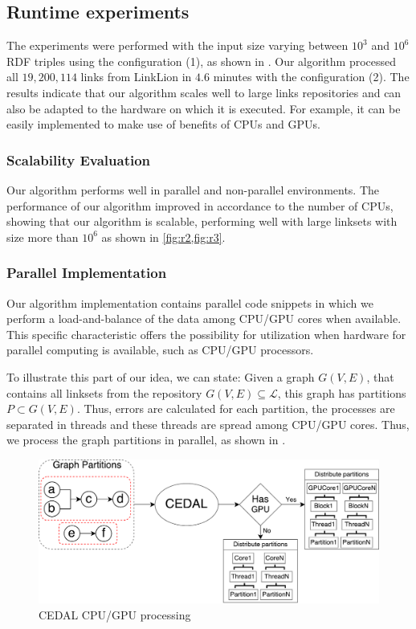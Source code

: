 \subsection{Runtime experiments}

The experiments were performed with the input size varying between $10^3$ and $10^6$ RDF triples using the configuration (1), as shown in . Our algorithm processed all $19,200,114$ links from LinkLion in $4.6$ minutes with the configuration (2). 
The results indicate that our algorithm scales well to large links repositories and can also be adapted to the hardware on which it is executed. For example, it can be easily implemented to make use of benefits of CPUs and GPUs.

\subsubsection{Scalability Evaluation}

Our algorithm performs well in parallel and non-parallel environments. The performance of our algorithm improved in accordance to the number of CPUs, showing that our algorithm is scalable, performing well with large linksets with size more than $10^6$ as shown in \cref{fig:r2,fig:r3}.

\subsubsection{Parallel Implementation}

Our algorithm implementation contains parallel code snippets in which we perform a load-and-balance of the data among CPU/GPU cores when available. This specific characteristic offers the possibility for utilization when hardware for parallel computing is available, such as CPU/GPU processors.


To illustrate this part of our idea, we can state: Given a graph $G(V,E)$, that contains all linksets from the repository $G(V,E) \subseteq \mathcal{L}$, this graph has partitions $P \subset G(V,E)$. Thus, errors are calculated for each partition, the processes are separated in threads and these threads are spread among CPU/GPU cores. Thus, we process the graph partitions in parallel, as shown in .

\begin{figure}[H]
	\centering
	\includegraphics[width=0.9\linewidth]{img/cpugpu4.pdf}
	\caption{CEDAL CPU/GPU processing}
	\label{fig:cpugpu1}
\end{figure}


